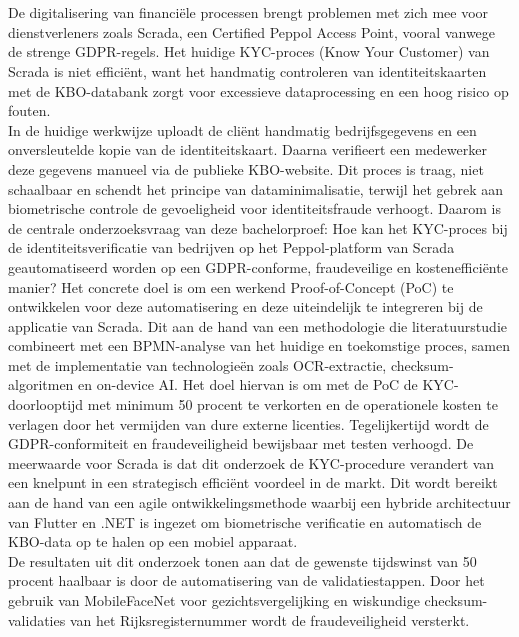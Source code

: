 \chapter*{}
De digitalisering van financiële processen brengt problemen met zich mee voor dienstverleners zoals Scrada, een Certified Peppol Access Point, vooral vanwege de strenge GDPR-regels. 
Het huidige KYC-proces (Know Your Customer) van Scrada is niet efficiënt, want het handmatig controleren van identiteitskaarten met de KBO-databank zorgt voor excessieve dataprocessing en een hoog risico op fouten. \\
In de huidige werkwijze uploadt de cliënt handmatig bedrijfsgegevens en een onversleutelde kopie van de identiteitskaart. Daarna verifieert een medewerker deze gegevens manueel via de publieke KBO-website. 
Dit proces is traag, niet schaalbaar en schendt het principe van dataminimalisatie, terwijl het gebrek aan biometrische controle de gevoeligheid voor identiteitsfraude verhoogt.
Daarom is de centrale onderzoeksvraag van deze bachelorproef: Hoe kan het KYC-proces bij de identiteitsverificatie van bedrijven op het Peppol-platform van Scrada geautomatiseerd worden op een GDPR-conforme, fraudeveilige en kostenefficiënte manier? 
Het concrete doel is om een werkend Proof-of-Concept (PoC) te ontwikkelen voor deze automatisering en deze uiteindelijk te integreren bij de applicatie van Scrada. 
Dit aan de hand van een methodologie die literatuurstudie combineert met een BPMN-analyse van het huidige en toekomstige proces, 
samen met de implementatie van technologieën zoals OCR-extractie, checksum-algoritmen en on-device AI.
Het doel hiervan is om met de PoC de KYC-doorlooptijd met minimum 50 procent te verkorten en de operationele kosten te verlagen door het vermijden van dure externe licenties.
Tegelijkertijd wordt de GDPR-conformiteit en fraudeveiligheid bewijsbaar met testen verhoogd. De meerwaarde voor Scrada is dat dit onderzoek de KYC-procedure verandert van een knelpunt in een 
strategisch efficiënt voordeel in de markt. Dit wordt bereikt aan de hand van een agile ontwikkelingsmethode waarbij een hybride architectuur van Flutter en .NET is ingezet om biometrische
verificatie en automatisch de KBO-data op te halen op een mobiel apparaat. \\
De resultaten uit dit onderzoek tonen aan dat de gewenste tijdswinst van 50 procent haalbaar is door de automatisering van de validatiestappen. 
Door het gebruik van MobileFaceNet voor gezichtsvergelijking en wiskundige checksum-validaties van het Rijksregisternummer wordt de fraudeveiligheid versterkt. 
